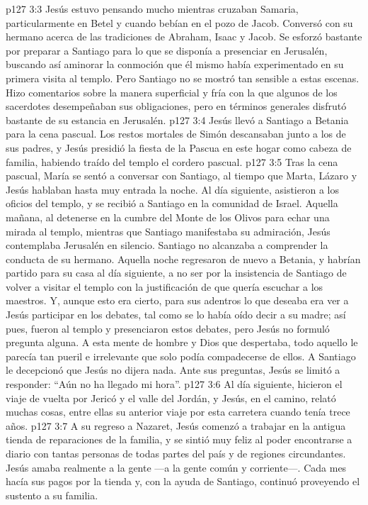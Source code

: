 \vs p127 3:3 Jesús estuvo pensando mucho mientras cruzaban Samaria, particularmente en Betel y cuando bebían en el pozo de Jacob. Conversó con su hermano acerca de las tradiciones de Abraham, Isaac y Jacob. Se esforzó bastante por preparar a Santiago para lo que se disponía a presenciar en Jerusalén, buscando así aminorar la conmoción que él mismo había experimentado en su primera visita al templo. Pero Santiago no se mostró tan sensible a estas escenas. Hizo comentarios sobre la manera superficial y fría con la que algunos de los sacerdotes desempeñaban sus obligaciones, pero en términos generales disfrutó bastante de su estancia en Jerusalén.
\vs p127 3:4 Jesús llevó a Santiago a Betania para la cena pascual. Los restos mortales de Simón descansaban junto a los de sus padres, y Jesús presidió la fiesta de la Pascua en este hogar como cabeza de familia, habiendo traído del templo el cordero pascual.
\vs p127 3:5 Tras la cena pascual, María se sentó a conversar con Santiago, al tiempo que Marta, Lázaro y Jesús hablaban hasta muy entrada la noche. Al día siguiente, asistieron a los oficios del templo, y se recibió a Santiago en la comunidad de Israel. Aquella mañana, al detenerse en la cumbre del Monte de los Olivos para echar una mirada al templo, mientras que Santiago manifestaba su admiración, Jesús contemplaba Jerusalén en silencio. Santiago no alcanzaba a comprender la conducta de su hermano. Aquella noche regresaron de nuevo a Betania, y habrían partido para su casa al día siguiente, a no ser por la insistencia de Santiago de volver a visitar el templo con la justificación de que quería escuchar a los maestros. Y, aunque esto era cierto, para sus adentros lo que deseaba era ver a Jesús participar en los debates, tal como se lo había oído decir a su madre; así pues, fueron al templo y presenciaron estos debates, pero Jesús no formuló pregunta alguna. A esta mente de hombre y Dios que despertaba, todo aquello le parecía tan pueril e irrelevante que solo podía compadecerse de ellos. A Santiago le decepcionó que Jesús no dijera nada. Ante sus preguntas, Jesús se limitó a responder: “Aún no ha llegado mi hora”.
\vs p127 3:6 Al día siguiente, hicieron el viaje de vuelta por Jericó y el valle del Jordán, y Jesús, en el camino, relató muchas cosas, entre ellas su anterior viaje por esta carretera cuando tenía trece años.
\vs p127 3:7 \pc A su regreso a Nazaret, Jesús comenzó a trabajar en la antigua tienda de reparaciones de la familia, y se sintió muy feliz al poder encontrarse a diario con tantas personas de todas partes del país y de regiones circundantes. Jesús amaba realmente a la gente ---a la gente común y corriente---. Cada mes hacía sus pagos por la tienda y, con la ayuda de Santiago, continuó proveyendo el sustento a su familia.
